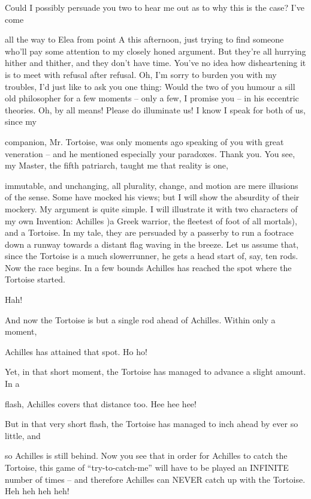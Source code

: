 \zeno Could I possibly persuade you two to hear me out as to why this is the case? I’ve come\par
all the way to Elea from point A this afternoon, just trying to find someone who’ll pay some attention to my closely honed argument. But they’re all hurrying hither and thither, and they don’t have time. You’ve no idea how disheartening it is to meet with refusal after refusal. Oh, I’m sorry to burden you with my troubles, I’d just like to ask you one thing: Would the two of you humour a sill old philosopher for a few moments – only a few, I promise you – in his eccentric theories. 
\achilles Oh, by all means! Please do illuminate us! I know I speak for both of us, since my\par
companion, Mr. Tortoise, was only moments ago speaking of you with great veneration – and he mentioned especially your paradoxes. 
\zeno Thank you. You see, my Master, the fifth patriarch, taught me that reality is one,\par
immutable, and unchanging, all plurality, change, and motion are mere illusions of the sense. Some have mocked his views; but I will show the absurdity of their mockery. My argument is quite simple. I will illustrate it with two characters of my own Invention: Achilles )a Greek warrior, the fleetest of foot of all mortals), and a Tortoise. In my tale, they are persuaded by a passerby to run a footrace down a runway towards a distant flag waving in the breeze. Let us assume that, since the Tortoise is a much slowerrunner, he gets a head start of, say, ten rods. Now the race begins. In a few bounds Achilles has reached the spot where the Tortoise started. 








\achilles Hah!\par

\zeno And now the Tortoise is but a single rod ahead of Achilles. Within only a moment,\par
Achilles has attained that spot. 
\achilles Ho ho!\par

\zeno Yet, in that short moment, the Tortoise has managed to advance a slight amount. In a\par
flash, Achilles covers that distance too. 
\achilles Hee hee hee!\par

\zeno But in that very short flash, the Tortoise has managed to inch ahead by ever so little, and\par
so Achilles is still behind. Now you see that in order for Achilles to catch the Tortoise, this game of “try-to-catch-me” will have to be played an INFINITE number of times – and therefore Achilles can NEVER catch up with the Tortoise. 
\tortoise Heh heh heh heh!\par

